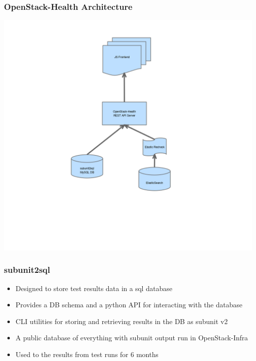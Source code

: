 \documentclass[aspectratio=43,11pt,hyperref={colorlinks=true}]{beamer}
\begin{document}
\begin{frame}
    \frametitle{OpenStack-Health Architecture}
    \begin{center}
        \includegraphics[height=1.1\textheight]{openstack-health-arch.png}
    \end{center}
\end{frame}

\begin{frame}
    \frametitle{subunit2sql}
    \begin{itemize}
        \item Designed to store test results data in a sql database
        \item Provides a DB schema and a python API for interacting with the
              database
        \item CLI utilities for storing and retrieving results in the DB as subunit v2
        \item A public database of everything with subunit output run in OpenStack-Infra
        \item Used to the results from test runs for 6 months
    \end{itemize}

\end{frame}
\end{document}
